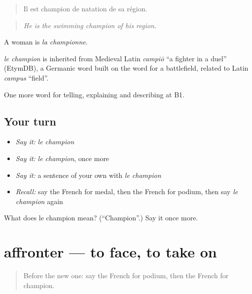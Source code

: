 \begin{quote}
Il est champion de natation de sa région.
\end{quote}

\begin{quote}
\emph{He is the swimming champion of his region.}
\end{quote}

A woman is \emph{la championne}.

\begin{cousinweb}
\emph{le champion} is inherited from Medieval Latin \emph{campiō} \textquotedblleft{}a fighter in a duel\textquotedblright{} (EtymDB), a Germanic word built on the word for a battlefield, related to Latin \emph{campus} \textquotedblleft{}field\textquotedblright{}.
\end{cousinweb}

\begin{grammarlens}[title={What you've built}]
One more word for telling, explaining and describing at B1.
\end{grammarlens}

\subsection*{Your turn}
\begin{itemize}
\raggedright
  \item \emph{Say it:} \emph{le champion}
  \item \emph{Say it:} \emph{le champion}, once more
  \item \emph{Say it:} a sentence of your own with \emph{le champion}
  \item \emph{Recall:} say the French for medal, then the French for podium, then say \emph{le champion} again
\end{itemize}

\begin{tcolorbox}[breakable,colback=teal!4,colframe=teal!35!black,title={Before you move on}]
What does le champion mean? (\textquotedblleft{}Champion\textquotedblright{}.) Say it once more.
\end{tcolorbox}
\section[affronter]{affronter — to face, to take on}

\label{lesson:FR-C507-affronter}



\begin{quote}
Before the new one: say the French for podium, then the French for champion.
\end{quote}

